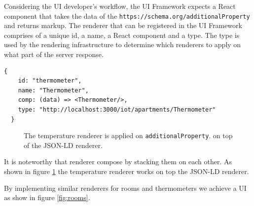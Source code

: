 Considering the UI developer's workflow, the UI Framework expects a React component that takes the data of the \lstinline{https://schema.org/additionalProperty} and returns markup. The renderer that can be registered in the UI Framework comprises of a unique id, a name, a React component and a type. The type is used by the rendering infrastructure to determine which renderers to apply on what part of the server response.

\lstset{language=JSON}
\begin{lstlisting}[caption=Renderer configuration that the developer provides.]
  {
    id: "thermometer",
    name: "Thermometer",
    comp: (data) => <Thermometer/>,
    type: "http://localhost:3000/iot/apartments/Thermometer"
  }
\end{lstlisting}

\begin{figure}[!htb]
  \caption{The temperature renderer is applied on \lstinline{additionalProperty}. on top of the JSON-LD renderer.}
  \label{fig:temperature}
\end{figure}

It is noteworthy that renderer compose by stacking them on each other. As shown in figure \ref{fig:temperature} the temperature renderer works on top the JSON-LD renderer.

By implementing similar renderers for rooms and thermometers we achieve a UI as show in figure \ref{fig:rooms}.

